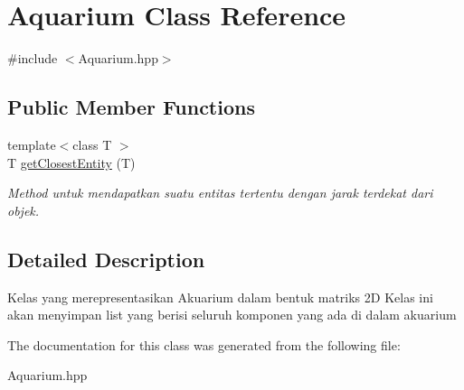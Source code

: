 \hypertarget{classAquarium}{}\section{Aquarium Class Reference}
\label{classAquarium}


{\ttfamily \#include $<$Aquarium.\+hpp$>$}

\subsection*{Public Member Functions}
\begin{DoxyCompactItemize}
\item 
\mbox{\label{classAquarium_aa1389622ce9474dbdc955e04b6efd1dc}} 
{\footnotesize template$<$class T $>$ }\\T \hyperlink{classAquarium_aa1389622ce9474dbdc955e04b6efd1dc}{get\+Closest\+Entity} (T)
\begin{DoxyCompactList}\small\item\em Method untuk mendapatkan suatu entitas tertentu dengan jarak terdekat dari objek. \end{DoxyCompactList}\end{DoxyCompactItemize}


\subsection{Detailed Description}
Kelas yang merepresentasikan Akuarium dalam bentuk matriks 2D Kelas ini akan menyimpan list yang berisi seluruh komponen yang ada di dalam akuarium 

The documentation for this class was generated from the following file\+:\begin{DoxyCompactItemize}
\item 
Aquarium.\+hpp\end{DoxyCompactItemize}
